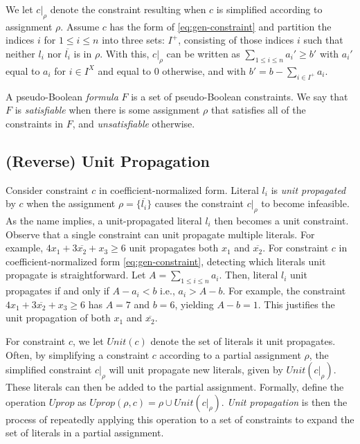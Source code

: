 \message{ !name(FMCAD2024.tex)}\documentclass{fmcad}
\begin{document}
We let $c|_{\rho}$ denote the constraint resulting when $c$ is simplified according
to assignment $\rho$. Assume $c$ has the form of \ref{eq:gen-constraint} and partition the indices
$i$ for $1 \leq i \leq n$ into three sets: $I^+$, consisting of those indices $i$ such that
neither $l_i$ nor $\overline{l_i}$ is in $\rho$. With this, $c|_\rho$ can be written as
$\sum_{1 \leq i \leq n} a_i' \geq b'$ with $a_i'$ equal to $a_i$ for $i \in I^X$ and equal to 0
otherwise, and with $b' = b - \sum_{i \in I^+} a_i$.

A pseudo-Boolean \textit{formula} $F$ is a set of pseudo-Boolean constraints. We say that $F$ is
\textit{satisfiable} when there is some assignment $\rho$ that satisfies all of the constraints in
$F$, and \textit{unsatisfiable} otherwise.

\subsection{(Reverse) Unit Propagation}
Consider constraint $c$ in coefficient-normalized form. Literal $l_i$ is \textit{unit propagated}
by $c$ when the assignment $\rho = \{\overline{l_i}\}$ causes the constraint $c|_\rho$ to become
infeasible. As the name implies, a unit-propagated literal $l_i$ then becomes a unit constraint.
Observe that a single constraint can unit propagate multiple literals. For example,
$4x_1 + 3\overline{x_2} + x_3 \geq 6$ unit propagates both $x_1$ and $\overline{x_2}$. For constraint
$c$ in coefficient-normalized form \ref{eq:gen-constraint}, detecting which literals unit propagate
is straightforward. Let $A = \sum_{1 \leq i \leq n} a_i$. Then, literal $l_i$ unit propagates if
and only if $A - a_i < b$ i.e., $a_i > A - b$. For example, the constraint
$4 x_1 + 3 \overline{x_2} + x_3 \geq 6$ has $A = 7$ and $b = 6$, yielding $A - b = 1$. This
justifies the unit propagation of both $x_1$ and $\overline{x_2}$.

For constraint $c$, we let $Unit(c)$ denote the set of literals it unit propagates. Often, by
simplifying a constraint $c$ according to a partial assignment $\rho$, the simplified constraint
$c|_\rho$ will unit propagate new literals, given by $Unit(c|_\rho)$. These literals can then be
added to the partial assignment. Formally, define the operation $Uprop$ as
$Uprop(\rho, c) = \rho \cup Unit(c|_\rho)$. \textit{Unit propagation} is then the process of
repeatedly applying this operation to a set of constraints to expand the set of literals in a
partial assignment.
\end{document}
